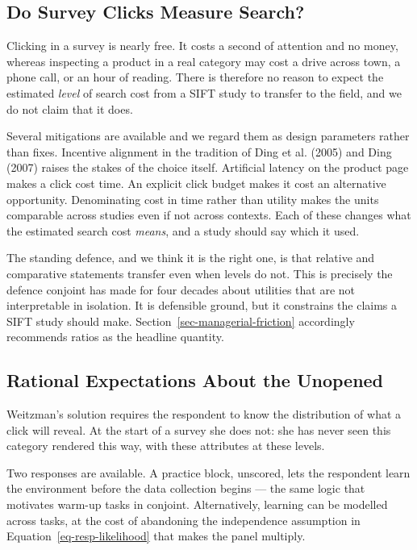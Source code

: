 \documentclass[
  letterpaper,
  DIV=11,
  numbers=noendperiod]{scrartcl}
\begin{document}
\subsection{Do Survey Clicks Measure Search?}\label{sec-disc-clicks}

Clicking in a survey is nearly free. It costs a second of attention and
no money, whereas inspecting a product in a real category may cost a
drive across town, a phone call, or an hour of reading. There is
therefore no reason to expect the estimated \emph{level} of search cost
from a SIFT study to transfer to the field, and we do not claim that it
does.

Several mitigations are available and we regard them as design
parameters rather than fixes. Incentive alignment in the tradition of
Ding et al. (2005) and Ding (2007) raises the stakes of the choice
itself. Artificial latency on the product page makes a click cost time.
An explicit click budget makes it cost an alternative opportunity.
Denominating cost in time rather than utility makes the units comparable
across studies even if not across contexts. Each of these changes what
the estimated search cost \emph{means}, and a study should say which it
used.

The standing defence, and we think it is the right one, is that relative
and comparative statements transfer even when levels do not. This is
precisely the defence conjoint has made for four decades about utilities
that are not interpretable in isolation. It is defensible ground, but it
constrains the claims a SIFT study should make.
Section~\ref{sec-managerial-friction} accordingly recommends ratios as
the headline quantity.

\subsection{Rational Expectations About the
Unopened}\label{sec-disc-expectations}

Weitzman's solution requires the respondent to know the distribution of
what a click will reveal. At the start of a survey she does not: she has
never seen this category rendered this way, with these attributes at
these levels.

Two responses are available. A practice block, unscored, lets the
respondent learn the environment before the data collection begins ---
the same logic that motivates warm-up tasks in conjoint. Alternatively,
learning can be modelled across tasks, at the cost of abandoning the
independence assumption in Equation~\ref{eq-resp-likelihood} that makes
the panel multiply.
\end{document}
